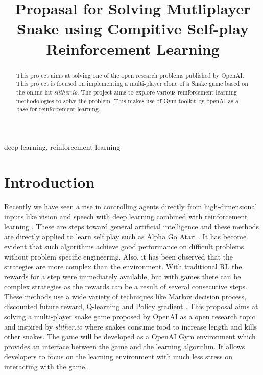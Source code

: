 \documentclass[conference]{IEEEtran}
\begin{document}
\title{Propasal for Solving Mutliplayer Snake using Compitive Self-play Reinforcement Learning}

\author{
\and
{}
\and
{}
}

\maketitle

\begin{abstract}
This project aims at solving one of the open research problems published by OpenAI\cite{n3}. This project is focused on implementing a multi-player clone of a Snake game based on the online hit \textit{slither.io}. The project aims to explore various reinforcement learning methodologies to solve the problem. This makes use of Gym toolkit by openAI as a base for reinforcement learning.
\end{abstract}

\begin{IEEEkeywords}
deep learning, reinforcement learning
\end{IEEEkeywords}

\section{Introduction}
Recently we have seen a rise in controlling agents directly from
high-dimensional inputs like vision and speech with deep learning combined
with reinforcement learning \cite{sp3} \cite{sd5}. These are steps toward
general artificial intelligence and these methods are directly applied to
learn self play such as Alpha Go \cite{sp9} Atari \cite{sp3}. It has become
evident that such algorithms achieve good performance on difficult problems
without problem specific engineering. Also, it has been observed that the
strategies are more complex than the environment. With traditional RL the
rewards for a step were immediately available, but with games there can be
complex strategies as the rewards can be a result of several consecutive steps.
These methods use a wide variety of techniques like Markov decision process,
discounted future reward, Q-learning \cite{sd5} and Policy gradient \cite{sd4}.\break
This proposal aims at solving a multi-player snake game proposed by OpenAI as a open research topic and inspired by
\textit{slither.io} \cite{sd2} where snakes consume food to increase length and
kills other snakes. The game will be developed as a
OpenAI Gym \cite{sd2} environment which provides an interface between the game
and the learning algorithm. It allows developers to focus on the learning
environment with much less stress on interacting with the game.
\end{document}
